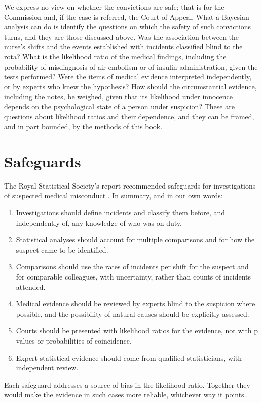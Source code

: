 We express no view on whether the convictions are safe; that is for the Commission and, if the case is referred, the Court of Appeal. What a Bayesian analysis can do is identify the questions on which the safety of such convictions turns, and they are those discussed above. Was the association between the nurse's shifts and the events established with incidents classified blind to the rota? What is the likelihood ratio of the medical findings, including the probability of misdiagnosis of air embolism or of insulin administration, given the tests performed? Were the items of medical evidence interpreted independently, or by experts who knew the hypothesis? How should the circumstantial evidence, including the notes, be weighed, given that its likelihood under innocence depends on the psychological state of a person under suspicion? These are questions about likelihood ratios and their dependence, and they can be framed, and in part bounded, by the methods of this book.

\section{Safeguards}

The Royal Statistical Society's report recommended safeguards for investigations of suspected medical misconduct \citep{rss2022}. In summary, and in our own words:
\begin{enumerate}[label=(\roman*)]
\item Investigations should define incidents and classify them before, and independently of, any knowledge of who was on duty.
\item Statistical analyses should account for multiple comparisons and for how the suspect came to be identified.
\item Comparisons should use the rates of incidents per shift for the suspect and for comparable colleagues, with uncertainty, rather than counts of incidents attended.
\item Medical evidence should be reviewed by experts blind to the suspicion where possible, and the possibility of natural causes should be explicitly assessed.
\item Courts should be presented with likelihood ratios for the evidence, not with p values or probabilities of coincidence.
\item Expert statistical evidence should come from qualified statisticians, with independent review.
\end{enumerate}
Each safeguard addresses a source of bias in the likelihood ratio. Together they would make the evidence in such cases more reliable, whichever way it points.

